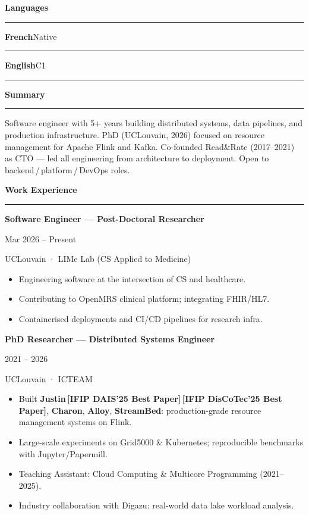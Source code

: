 \documentclass[9.5pt, a4paper]{article}
\newlength{\sideW}  \setlength{\sideW}{0.32\paperwidth}
\newlength{\mainW}  \setlength{\mainW}{0.68\paperwidth}
\newlength{\spad}   \setlength{\spad}{6.5mm}
\newlength{\mpad}   \setlength{\mpad}{8mm}
\newcommand{\sidesec}[1]{%
  \vspace{5pt}%
  {\bfseries\color{dark}\normalsize #1}\par\nopagebreak
  {\color{accent}\rule{\linewidth}{1.2pt}}\par
  \vspace{2pt}%
}
\newcommand{\mainsec}[1]{%
  \vspace{4pt}%
  {\large\bfseries\color{dark} #1}\par\nopagebreak
  {\color{dark!30}\rule{\linewidth}{0.7pt}}\par
  \vspace{2pt}%
}
\newcommand{\jobentry}[4]{%
  {\bfseries\color{dark}\small #2}\par
  {\color{accent}\footnotesize #1}\par
  {\color{muted}\footnotesize #3}\par
  \vspace{1pt}%
  #4%
  \vspace{4pt}%
}
\newcommand{\award}[1]{\,{\scriptsize\bfseries\color{award}[#1]}}
\begin{document}
\begin{minipage}[t]{\sideW}
\begin{minipage}[t]{\sideW - 2\spad}
\sidesec{Languages}

{\bfseries\color{dark}\small French}\hfill{\color{muted}\footnotesize Native}\par\vspace{2pt}
{\color{accent}\rule{\linewidth}{3pt}}\par
\vspace{4pt}
{\bfseries\color{dark}\small English}\hfill{\color{muted}\footnotesize C1}\par\vspace{2pt}
{\color{accent!75}\rule{0.83\linewidth}{3pt}}\par

\end{minipage}
\end{minipage}%
\begin{minipage}[t]{\mainW}
\hspace{\mpad}\begin{minipage}[t]{\mainW - 2\mpad}
\vspace{8mm}

\mainsec{Summary}
{\color{muted}\small
Software engineer with 5+ years building distributed systems, data pipelines,
and production infrastructure. PhD (UCLouvain, 2026) focused on resource
management for Apache Flink and Kafka. Co-founded Read\&Rate (2017--2021) as
CTO --- led all engineering from architecture to deployment. Open to
backend\,/\,platform\,/\,DevOps roles.}

\mainsec{Work Experience}

\jobentry{Mar 2026 – Present}
  {Software Engineer — Post-Doctoral Researcher}
  {UCLouvain · LIMe Lab (CS Applied to Medicine)}
  {\begin{itemize}\small
    \item Engineering software at the intersection of CS and healthcare.
    \item Contributing to OpenMRS clinical platform; integrating FHIR/HL7.
    \item Containerised deployments and CI/CD pipelines for research infra.
  \end{itemize}}

\jobentry{2021 – 2026}
  {PhD Researcher — Distributed Systems Engineer}
  {UCLouvain · ICTEAM}
  {\begin{itemize}\small
    \item Built \textbf{Justin}\award{IFIP DAIS'25 Best Paper}\award{IFIP DisCoTec'25 Best Paper},
          \textbf{Charon}, \textbf{Alloy}, \textbf{StreamBed}:
          production-grade resource management systems on Flink.
    \item Large-scale experiments on Grid5000 \& Kubernetes; reproducible benchmarks with Jupyter/Papermill.
    \item Teaching Assistant: Cloud Computing \& Multicore Programming (2021–2025).
    \item Industry collaboration with Digazu: real-world data lake workload analysis.
  \end{itemize}}


\end{minipage}
\end{minipage}
\end{document}
